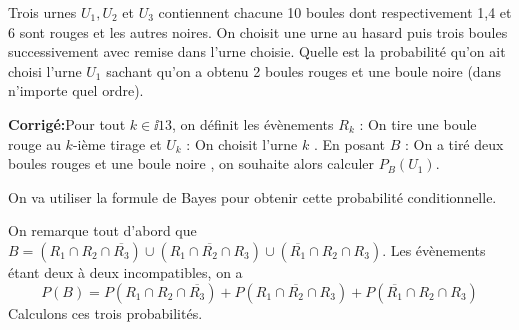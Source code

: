 \documentclass[a4paper,twoside,french,10pt]{VcCours}
\newcommand{\corr}{\textbf{Corrigé:}}
\begin{document}
\begin{Exercice}{} Trois urnes $U_1, U_2 $ et $U_3$ contiennent chacune 10 boules dont respectivement 1,4 et 6 sont rouges et les autres noires. On choisit une urne au hasard puis trois boules successivement avec remise dans l'urne choisie. Quelle est la probabilité qu'on ait choisi l'urne $U_1$ sachant qu'on a obtenu 2 boules rouges et une boule noire (dans n'importe quel ordre).
\end{Exercice}

\corr Pour tout $k \in \ii13$, on définit les évènements $R_k$ : \og On tire une boule rouge au $k$-ième tirage \fg et $U_k$ : \og On choisit l'urne $k$ \fg . En posant $B$ : \og On a tiré deux boules rouges et une boule noire \fg , on souhaite  alors calculer $P_B(U_1)$.

\vspace{0.2cm}

\noindent On va utiliser la formule de Bayes pour obtenir cette probabilité conditionnelle.

\vspace{0.2cm}

\noindent On remarque tout d'abord que $B = (R_1 \cap R_2 \cap \overline{R_3}) \cup (R_1 \cap \overline{R_2} \cap R_3) \cup (\overline{R_1} \cap R_2 \cap R_3)$. Les évènements étant deux à deux incompatibles, on a 
\[ P(B) = P( R_1 \cap R_2 \cap \overline{R_3}) + P(R_1 \cap \overline{R_2} \cap R_3) + P(\overline{R_1} \cap R_2 \cap R_3) \]
\noindent Calculons ces trois probabilités.
\end{document}

